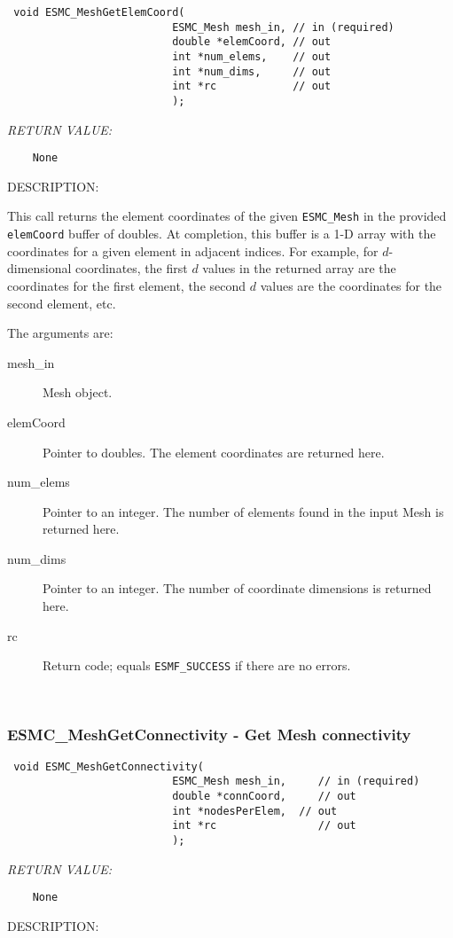   
\begin{verbatim} void ESMC_MeshGetElemCoord(
                          ESMC_Mesh mesh_in, // in (required)
                          double *elemCoord, // out
                          int *num_elems,    // out
                          int *num_dims,     // out
                          int *rc            // out
                          );\end{verbatim}{\em RETURN VALUE:}
\begin{verbatim}    None\end{verbatim}
{\sf DESCRIPTION:\\ }


  
   This call returns the element coordinates of the given {\tt ESMC\_Mesh}
   in the provided {\tt elemCoord} buffer of doubles.  At completion, this
   buffer is a 1-D array with the coordinates for a given element
   in adjacent indices.  For example, for $d$-dimensional coordinates, the first
   $d$ values in the returned array are the coordinates for the first element,
   the second $d$ values are the coordinates for the second element, etc.
  
   The arguments are:
   \begin{description}
   \item[mesh\_in] Mesh object.
   \item[elemCoord] Pointer to doubles.  The element coordinates are returned here.
   \item[num\_elems] Pointer to an integer.  The number of elements found in
   the input Mesh is returned here.
   \item[num\_dims] Pointer to an integer.  The number of coordinate dimensions
   is returned here.
   \item[rc] Return code; equals {\tt ESMF\_SUCCESS} if there are no
   errors.
   \end{description}
   
 
\mbox{}\hrulefill\ 
 
\subsubsection [ESMC\_MeshGetConnectivity] {ESMC\_MeshGetConnectivity - Get Mesh connectivity}


  
\begin{verbatim} void ESMC_MeshGetConnectivity(
                          ESMC_Mesh mesh_in,     // in (required)
                          double *connCoord,     // out
                          int *nodesPerElem,  // out
                          int *rc                // out
                          );\end{verbatim}{\em RETURN VALUE:}
\begin{verbatim}    None\end{verbatim}
{\sf DESCRIPTION:\\ }


